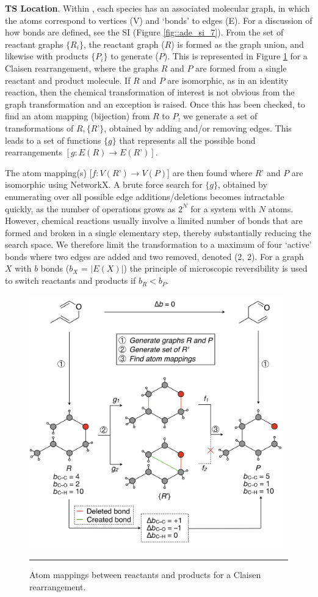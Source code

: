 \documentclass[../../main.tex]{subfiles}
\begin{document}
{\bfseries{TS Location}}. Within \ade, each species has an associated molecular graph, in which the atoms correspond to vertices (V) and ‘bonds’ to edges (E). For a discussion of how bonds are defined, see the SI (Figure \ref{fig::ade_si_7}). From the set of reactant graphs $\{R_i\}$, the reactant graph ($R$) is formed as the graph union, and likewise with products $\{P_i\}$ to generate ($P$). This is represented in Figure \ref{fig::ade_3} for a Claisen rearrangement, where the graphs $R$ and $P$ are formed from a single reactant and product molecule. If $R$ and $P$ are isomorphic, as in an identity reaction, then the chemical transformation of interest is not obvious from the graph transformation and an exception is raised. Once this has been checked, to find an atom mapping (bijection) from $R$ to $P$, we generate a set of transformations of $R, \{R’\}$, obtained by adding and/or removing edges. This leads to a set of functions $\{g\}$ that represents all the possible bond rearrangements $[g: E(R) \rightarrow E(R’)]$.


The atom mapping(s) [$f: V(R’) \rightarrow V(P)$] are then found where $R’$ and $P$ are isomorphic using NetworkX.\cite{NetworkX} A brute force search for $\{g\}$, obtained by enumerating over all possible edge additions/deletions becomes intractable quickly, as the number of operations grows as $2^N$ for a system with $N$ atoms. However, chemical reactions usually involve a limited number of bonds that are formed and broken in a single elementary step, thereby substantially reducing the search space. We therefore limit the transformation to a maximum of four ‘active’ bonds where two edges are added and two removed, denoted (2, 2). For a graph $X$ with $b$ bonds ($b_X$ = $|E(X)|$) the principle of microscopic reversibility is used to switch reactants and products if $b_R < b_P$. 


\begin{figure}[h!]
	\vspace{0.4cm}
	\centering
	\includegraphics[width=11cm]{5/autode/figs/fig3}
	\vspace{0.4cm}
	\hrule
	\caption{Atom mappings between reactants and products for a Claisen rearrangement.}
	\label{fig::ade_3}
\end{figure}
\end{document}
